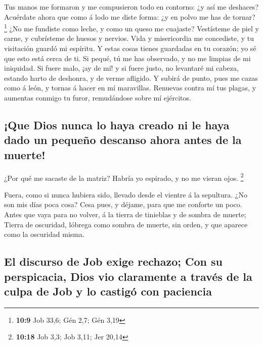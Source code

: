  Tus manos me formaron y me compusieron todo en contorno: ¿y
así me deshaces?  Acuérdate ahora que como á lodo me diste
forma: ¿y en polvo me has de tornar? \footnote{\textbf{10:9} Job 33,6;
  Gén 2,7; Gén 3,19}  ¿No me fundiste como leche, y como un
queso me cuajaste?  Vestísteme de piel y carne, y
cubrísteme de huesos y nervios.  Vida y misericordia me
concediste, y tu visitación guardó mi espíritu.  Y estas
cosas tienes guardadas en tu corazón; yo sé que esto está cerca de ti.
 Si pequé, tú me has observado, y no me limpias de mi
iniquidad.  Si fuere malo, ¡ay de mí! y si fuere justo, no
levantaré mi cabeza, estando harto de deshonra, y de verme afligido.
 Y subirá de punto, pues me cazas como á león, y tornas á
hacer en mí maravillas.  Renuevas contra mí tus plagas, y
aumentas conmigo tu furor, remudándose sobre mí ejércitos.

\hypertarget{que-dios-nunca-lo-haya-creado-ni-le-haya-dado-un-pequeuxf1o-descanso-ahora-antes-de-la-muerte}{%
\subsection{¡Que Dios nunca lo haya creado ni le haya dado un pequeño
descanso ahora antes de la
muerte!}\label{que-dios-nunca-lo-haya-creado-ni-le-haya-dado-un-pequeuxf1o-descanso-ahora-antes-de-la-muerte}}

 ¿Por qué me sacaste de la matriz? Habría yo espirado, y no
me vieran ojos. \footnote{\textbf{10:18} Job 3,3; Job 3,11; Jer 20,14}

 Fuera, como si nunca hubiera sido, llevado desde el
vientre á la sepultura.  ¿No son mis días poca cosa? Cesa
pues, y déjame, para que me conforte un poco.  Antes que
vaya para no volver, á la tierra de tinieblas y de sombra de muerte;
 Tierra de oscuridad, lóbrega como sombra de muerte, sin
orden, y que aparece como la oscuridad misma.

\hypertarget{el-discurso-de-job-exige-rechazo-con-su-perspicacia-dios-vio-claramente-a-travuxe9s-de-la-culpa-de-job-y-lo-castiguxf3-con-paciencia}{%
\subsection{El discurso de Job exige rechazo; Con su perspicacia, Dios
vio claramente a través de la culpa de Job y lo castigó con
paciencia}\label{el-discurso-de-job-exige-rechazo-con-su-perspicacia-dios-vio-claramente-a-travuxe9s-de-la-culpa-de-job-y-lo-castiguxf3-con-paciencia}}

